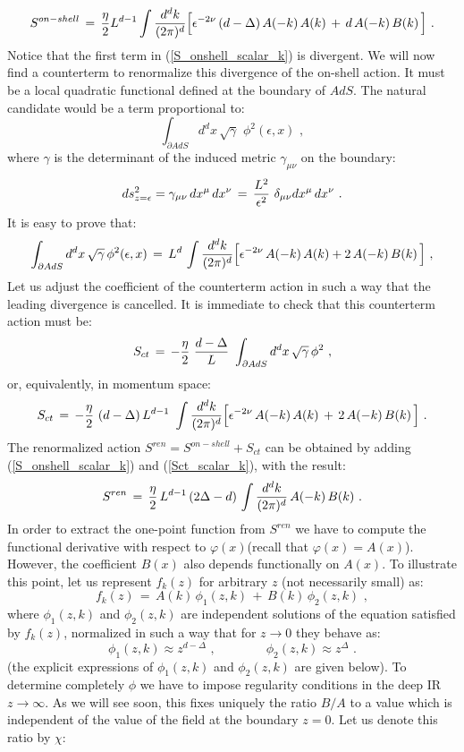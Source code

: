 \documentclass[12pt,notitlepage,a4paper]{article}
\newcommand{\beq}{\begin{equation}}
\newcommand{\eeq}{\end{equation}}
\begin{document}
\beq
S^{on-shell}\,=\,{\eta\over 2} L^{d-1}
\int {d^dk\over (2\pi)^d}\Big[
\epsilon^{-2\nu}\,(d-\Delta)\,A(-k)\,A(k)\,+\,d\,A(-k)\,B(k)\,\Big]\,\,.
\label{S_onshell_scalar_k}
\eeq
Notice that the first term in (\ref{S_onshell_scalar_k}) is divergent. We will now find a counterterm to renormalize this divergence of the on-shell action. It  must be a local quadratic functional defined at the boundary of $AdS$. The natural candidate would be a term proportional to:
\beq
\int_{\partial AdS} d^d x\, \sqrt{\gamma}\,\,\phi^2 (\epsilon, x)\,\,,
\eeq
where $\gamma$ is the determinant of the induced metric  $\gamma_{\mu\nu}$  on the boundary:
\beq
ds^2_{z=\epsilon}=\gamma_{\mu\nu}\,dx^{\mu}\,dx^{\nu}\,=\,
{L^2\over \epsilon^2}\,\,\delta_{\mu\nu} dx^{\mu}\,dx^{\nu}\,\,.
\eeq
It is easy to prove  that:
\beq
\int_{\partial AdS} d^d x\, \sqrt{\gamma}\,\phi^2 (\epsilon, x)\,=\,
L^d\,\int {d^dk\over (2\pi)^d}\Big[
\epsilon^{-2\nu}\,A(-k)\,A(k)+2\,A(-k)\,B(k)\,\Big]\,\,,
\eeq
Let us adjust the coefficient of the counterterm action in such a way that the leading divergence is cancelled. It is immediate to check that this counterterm action must be:
\beq
S_{ct}\,=\,-{\eta\over 2}\,\, {d-\Delta\over L}\,\,
\int_{\partial AdS} d^d x\, \sqrt{\gamma}\,\phi^2\,\,,
\eeq
or, equivalently, in momentum space:
\beq
S_{ct}\,=\,-{\eta\over 2}\,\, (d-\Delta)\, L^{d-1}\,\,
\int {d^dk\over (2\pi)^d}\Big[
\epsilon^{-2\nu}\,A(-k)\,A(k)\,+\,2\,A(-k)\,B(k)\,\Big]\,\,.
\label{Sct_scalar_k}
\eeq
The renormalized action $S^{ren}=S^{on-shell}+S_{ct}$  can be obtained by adding (\ref{S_onshell_scalar_k}) and (\ref{Sct_scalar_k}), with the result:
\beq
S^{ren}\,=\,{\eta\over 2}\, L^{d-1}\,(2\Delta-d)\,
\int {d^dk\over (2\pi)^d}\,A(-k)\,B(k)\,\,.
\label{Sren}
\eeq
In order to extract the one-point function from $S^{ren}$ we have to compute the functional derivative with respect to $\varphi(x)$(recall that $\varphi(x)=A(x)$). However, the coefficient $B(x)$ also depends functionally on $A(x)$. To illustrate this point,  let us represent $f_k(z)$ for arbitrary $z$ (not necessarily small) as:
\beq
f_k(z)\,=\,A(k)\,\phi_1(z,k)\,+\,B(k)\,\phi_2(z,k)\,\,,
\label{general_fk}
\eeq
where $\phi_1(z,k)$ and $\phi_2(z,k)$ are  independent solutions of the equation satisfied by $f_k(z)$, normalized in such a way that for $z\to 0$ they behave as:
\beq
\phi_1(z,k)\approx z^{d-\Delta}
\,\,,
\qquad\qquad
\phi_2(z,k)\approx z^{\Delta}\,\,.
\eeq
(the explicit expressions of  $\phi_1(z,k)$ and $\phi_2(z,k)$ are given below). To determine completely $\phi$ we have to impose regularity conditions in the deep IR $z\to\infty$. As we will see soon, this fixes uniquely the ratio $B/A$ to a value which is independent of the value of the field at the boundary $z=0$. Let us denote  this ratio by $\chi$:
\end{document}
